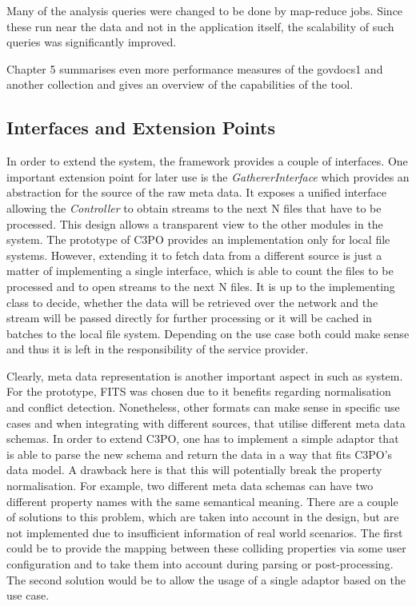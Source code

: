 Many of the analysis queries were changed to be done by map-reduce jobs. Since these run near the data and not in the application itself, the scalability of such queries was significantly improved.

Chapter 5 summarises even more performance measures of the govdocs1 and another collection and gives an overview of the capabilities of the tool.

\subsection{Interfaces and Extension Points}
In order to extend the system, the framework provides a couple of interfaces. One important extension point for later use is the \textit{GathererInterface} which provides an abstraction for the source of the raw meta data. It exposes a unified interface allowing the \textit{Controller} to obtain streams to the next N files that have to be processed. This design allows a transparent view to the other modules in the system. The prototype of C3PO provides an implementation only for local file systems. However, extending it to fetch data from a different source is just a matter of implementing a single interface, which is able to count the files to be processed and to open streams to the next N files. It is up to the implementing class to decide, whether the data will be retrieved over the network and the stream will be passed directly for further processing or it will be cached in batches to the local file system. Depending on the use case both could make sense and thus it is left in the responsibility of the service provider.

Clearly, meta data representation is another important aspect in such as system. For the prototype, FITS was chosen due to it benefits regarding normalisation and conflict detection. Nonetheless, other formats can make sense in specific use cases and when integrating with different sources, that utilise different meta data schemas. In order to extend C3PO, one has to implement a simple adaptor that is able to parse the new schema and return the data in a way that fits C3PO's data model. A drawback here is that this will potentially break the property normalisation. For example, two different meta data schemas can have two different property names with the same semantical meaning. There are a couple of solutions to this problem, which are taken into account in the design, but are not implemented due to insufficient information of real world scenarios. The first could be to provide the mapping between these colliding properties via some user configuration and to take them into account during parsing or post-processing. The second solution would be to allow the usage of a single adaptor based on the use case.

